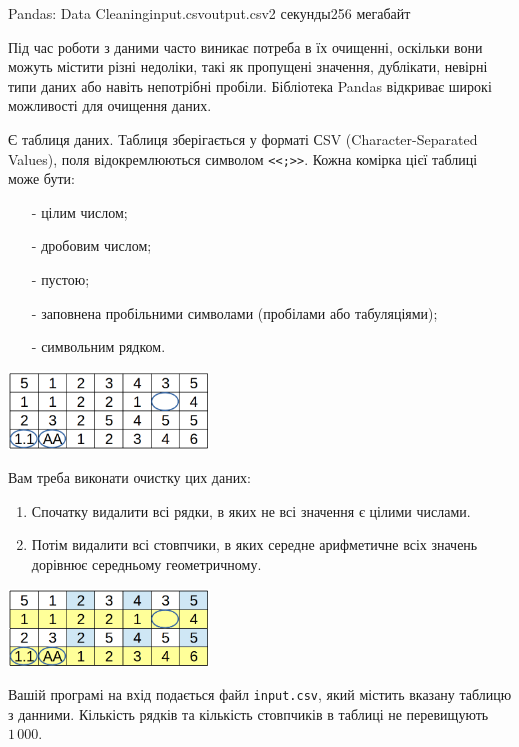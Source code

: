 \begin{problem}{Pandas: Data Cleaning}{input.csv}{output.csv}{2 секунды}{256 мегабайт}

Під час роботи з даними часто виникає потреба в їх очищенні, оскільки вони можуть містити різні недоліки, 
такі як пропущені значення, дублікати, невірні типи даних або навіть непотрібні пробіли.
Бібліотека Pandas відкриває широкі можливості для очищення даних.

Є таблиця даних. Таблиця зберігається у форматі СSV (Character-Separated Values), поля відокремлюються символом \texttt{<<;>>}.
Кожна комірка цієї таблиці може бути:
\begin{itemize}[topsep=0pt,itemsep=0pt,parsep=0pt,partopsep=0pt]
  \item[-] цілим числом;
  \item[-] дробовим числом;
  \item[-] пустою;
  \item[-] заповнена пробільними символами (пробілами або табуляціями);
  \item[-] символьним рядком.
\end{itemize}

\begin{center}
  \includegraphics[width=0.40\textwidth]{pic1.png}
\end{center}

Вам треба виконати очистку цих даних:
\begin{enumerate}
  \item Спочатку видалити всі рядки, в яких не всі значення є цілими числами.
  \item Потім видалити всі стовпчики, в яких середне арифметичне всіх значень дорівнює середньому геометричному.
\end{enumerate}

\begin{center}
  \includegraphics[width=0.40\textwidth]{pic2.png}
\end{center}

\InputFile
Вашій програмі на вхід подається файл \texttt{input.csv}, який містить вказану таблицю з данними.
Кількість рядків та кількість стовпчиків в таблиці не перевищують $1\,000$.


\end{problem}
